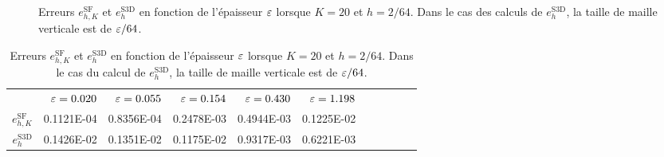 \begin{figure}[t!]
  \begin{center}
    
    \caption{Erreurs $e_{h,K}^\mathrm{SF}$ et $e_h^\mathrm{S3D}$ en fonction
    de l'épaisseur $\varepsilon$ lorsque $K = 20$ et $h = 2/64$. Dans
    le cas des calculs de $e_h^\mathrm{S3D}$, la taille de maille
    verticale est de $\varepsilon/64$.}
    \label{fig:e-sf-e-s3d-convergence}
  \end{center}
\end{figure}

\begin{table}[t!]
  \caption{Erreurs $e_{h,K}^\mathrm{SF}$ et $e_h^\mathrm{S3D}$ en
    fonction de l'épaisseur $\varepsilon$ lorsque $K = 20$ et $h =
    2/64$.  Dans le cas du calcul de $e_h^\mathrm{S3D}$, la taille de
    maille verticale est de $\varepsilon/64$.}
  \label{tab:e-sf-e-s3d-convergence}
  \begin{center}
    \begin{tabular}{@{}rrrrrrrrrrr@{}}
      \toprule
      & $\varepsilon = 0.020$
      & $\varepsilon = 0.055$
      & $\varepsilon = 0.154$
      & $\varepsilon = 0.430$
      & $\varepsilon = 1.198$ \\
      \cmidrule{2-6}
      $e_{h,K}^\mathrm{SF}$  & \num{0.1121E-04} & \num{0.8356E-04} & \num{0.2478E-03} & \num{0.4944E-03} & \num{0.1225E-02}\\
      $e_h^\mathrm{S3D}$ & \num{0.1426E-02} & \num{0.1351E-02} & \num{0.1175E-02} & \num{0.9317E-03} & \num{0.6221E-03}\\
      \bottomrule
    \end{tabular}
  \end{center}
\end{table}

